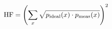 \documentclass[preview]{standalone}
\begin{document}
\begin{align*}
\special{dvisvgm:raw <g id='unique000'>}\text{HF} = \left(\sum_x \sqrt{p_{\text{ideal}}(x)\cdot p_{\text{meas}}(x)}\right)^2\special{dvisvgm:raw </g>}
\end{align*}
\end{document}
